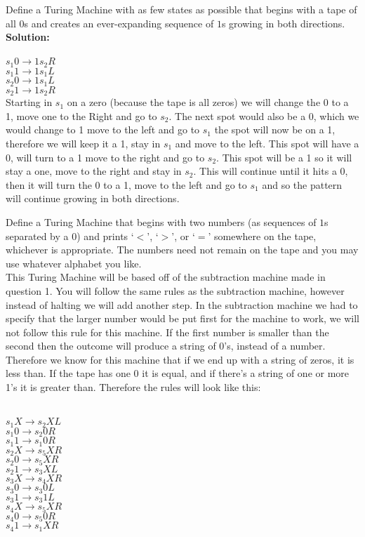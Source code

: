 \documentclass[12pt,letterpaper]{exam}
\begin{document}
\begin{questions}
\question
Define a Turing Machine with as few states as possible that begins with a tape of all $0$s and creates an ever-expanding sequence of $1$s growing in both directions.
\\
\textbf{Solution:}\\
\\$s_1 0 \rightarrow  1 s_2 R$
\\$s_1 1 \rightarrow 1 s_1 L$
\\$s_2 0 \rightarrow 1 s_1 L$
\\$s_2 1 \rightarrow 1 s_2 R$
\\
Starting in $s_1$ on a zero (because the tape is all zeros) we will change the 0 to a 1, move one to the Right and go to $s_2$. The next spot would also be a 0, which we would change to 1 move to the left and go to $s_1$ the spot will now be on a 1, therefore we will keep it a 1, stay in $s_1$ and move to the left. This spot will have a 0, will turn to a 1 move to the right and go to $s_2$. This spot will be a 1 so it will stay a one, move to the right and stay in $s_2$. This will continue until it hits a 0, then it will turn the 0 to a 1, move to the left and go to $s_1$ and so the pattern will continue growing in both directions.


\question
Define a Turing Machine that begins with two numbers (as sequences of $1$s separated by a $0$) and prints `$<$', `$>$', or `$=$' somewhere on the tape, whichever is appropriate. The numbers need not remain on the tape and you may use whatever alphabet you like.
\\
This Turing Machine will be based off of the subtraction machine made in question 1. You will follow the same rules as the subtraction machine, however instead of halting we will add another step. In the subtraction machine we had to specify that the larger number would be put first for the machine to work, we will not follow this rule for this machine. If the first number is smaller than the second then the outcome will produce a string of 0's, instead of a number. Therefore we know for this machine that if we end up with a string of zeros, it is less than. If the tape has one 0 it is equal, and if there's a string of one or more 1's it is greater than. Therefore the rules will look like this:

\\$s_1 X \rightarrow s_2 X L$
\\$s_1 0 \rightarrow s_2 0 R$
\\$s_1 1 \rightarrow s_1 0 R$
\\$s_2 X \rightarrow s_5 X R$
\\$s_2 0 \rightarrow s_5 X R$
\\$s_2 1 \rightarrow s_3 X L$
\\$s_3 X \rightarrow s_4 X R$
\\$s_3 0 \rightarrow s_3 0 L$
\\$s_3 1 \rightarrow s_3 1 L$
\\$s_4 X \rightarrow s_5 X R$
\\$s_4 0 \rightarrow s_5 0 R$
\\$s_4 1 \rightarrow s_1 X R$


\end{questions}
\end{document}
